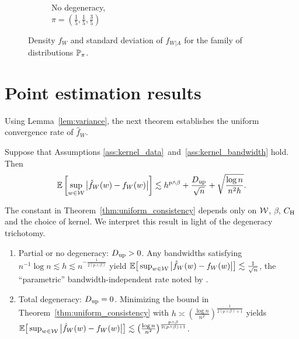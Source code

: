\begin{figure}[ht]
\begin{subfigure}{0.32\textwidth}
    \caption{
      No degeneracy, \\
      $\pi = \left( \frac{1}{5}, \frac{1}{5}, \frac{3}{5} \right)$
    }
  \end{subfigure}
  \caption{
    Density $f_W$ and standard deviation
    of $f_{W|A}$ for the family of distributions $\P_\pi$.\\
  }
  \label{fig:distribution}
\end{figure}

\section{Point estimation results}\label{sec:point_estimation}

Using Lemma~\ref{lem:variance},
the next theorem establishes the uniform
convergence rate of $\hat{f}_W$.
%
\begin{theorem}%
  \label{thm:uniform_consistency}%
  Suppose that Assumptions
  \ref{ass:kernel_data}~and~\ref{ass:kernel_bandwidth}
  hold. Then
  \begin{align*}
    \E\left[
      \sup_{w \in \cW}
      \big|\hat{f}_W(w) - f_W(w)\big|
    \right]
    \lesssim
    h^{p\wedge\beta}
    + \frac{\Du}{\sqrt n}
    + \sqrt{\frac{\log n}{n^2h}}.
  \end{align*}
\end{theorem}
%
The constant in Theorem~\ref{thm:uniform_consistency}
depends only on $\cW$, $\beta$, $C_\rH$
and the choice of kernel.
We interpret this result in light of the degeneracy trichotomy.
\begin{enumerate}[label=(\roman*)]\onehalfspacing
  \item Partial or no degeneracy:
    $\Du > 0$.
    Any bandwidths satisfying
    $n^{-1} \log n \lesssim h \lesssim n^{-\frac{1}{2(p\wedge\beta)}}$
    yield
    $\E\big[\sup_{w \in \cW}\big|\hat f_W(w)
    - f_W(w)\big| \big] \lesssim \frac{1}{\sqrt n}$,
    the ``parametric'' bandwidth-independent rate noted by
    \citet{graham2022kernel}.

  \item Total degeneracy:
    $\Du = 0$.
    Minimizing the bound in
    Theorem~\ref{thm:uniform_consistency} with
    $h \asymp \left( \frac{\log n}{n^2} \right)^{\frac{1}{2(p\wedge\beta)+1}}$
    yields
    $\E\big[ \sup_{w \in \cW} \big|\hat f_W(w) - f_W(w)\big| \big]
    \lesssim
    \big(\frac{\log n}{n^2} \big)^{\frac{p\wedge\beta}{2(p\wedge\beta)+1}}$.
\end{enumerate}


